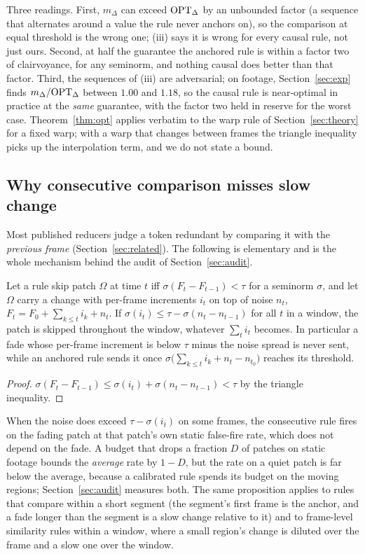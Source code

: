Three readings. First, $m_\Delta$ can exceed $\mathrm{OPT}_\Delta$ by an unbounded factor (a sequence that alternates around a value the rule never anchors on), so the comparison at equal threshold is the wrong one; (iii) says it is wrong for every causal rule, not just ours. Second, at half the guarantee the anchored rule is within a factor two of clairvoyance, for any seminorm, and nothing causal does better than that factor. Third, the sequences of (iii) are adversarial; on footage, Section~\ref{sec:exp} finds $m_\Delta / \mathrm{OPT}_\Delta$ between $1.00$ and $1.18$, so the causal rule is near-optimal in practice at the \emph{same} guarantee, with the factor two held in reserve for the worst case. Theorem~\ref{thm:opt} applies verbatim to the warp rule of Section~\ref{sec:theory} for a fixed warp; with a warp that changes between frames the triangle inequality picks up the interpolation term, and we do not state a bound.

\subsection{Why consecutive comparison misses slow change}
\label{sec:blind}

Most published reducers judge a token redundant by comparing it with the \emph{previous frame} (Section~\ref{sec:related}). The following is elementary and is the whole mechanism behind the audit of Section~\ref{sec:audit}.

\begin{proposition}
\label{prop:consecutive}
Let a rule skip patch $\Omega$ at time $t$ iff $\sigma(F_t - F_{t-1}) < \tau$ for a seminorm $\sigma$, and let $\Omega$ carry a change with per-frame increments $i_t$ on top of noise $n_t$, $F_t = F_0 + \sum_{k \le t} i_k + n_t$. If $\sigma(i_t) \le \tau - \sigma(n_t - n_{t-1})$ for all $t$ in a window, the patch is skipped throughout the window, whatever $\sum_t i_t$ becomes. In particular a fade whose per-frame increment is below $\tau$ minus the noise spread is never sent, while an anchored rule sends it once $\sigma\big(\sum_{k \le t} i_k + n_t - n_{t_0}\big)$ reaches its threshold.
\end{proposition}

\begin{proof}
$\sigma(F_t - F_{t-1}) \le \sigma(i_t) + \sigma(n_t - n_{t-1}) < \tau$ by the triangle inequality.
\end{proof}

When the noise does exceed $\tau - \sigma(i_t)$ on some frames, the consecutive rule fires on the fading patch at that patch's own static false-fire rate, which does not depend on the fade. A budget that drops a fraction $D$ of patches on static footage bounds the \emph{average} rate by $1 - D$, but the rate on a quiet patch is far below the average, because a calibrated rule spends its budget on the moving regions; Section~\ref{sec:audit} measures both. The same proposition applies to rules that compare within a short segment (the segment's first frame is the anchor, and a fade longer than the segment is a slow change relative to it) and to frame-level similarity rules within a window, where a small region's change is diluted over the frame and a slow one over the window.

